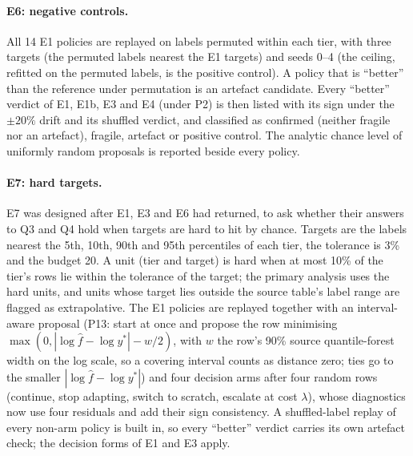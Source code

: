 \documentclass[11pt,a4paper]{article}
\begin{document}
\paragraph{E6: negative controls.} All 14 E1 policies are replayed on labels permuted within each
tier, with three targets (the permuted labels nearest the E1 targets) and seeds 0--4 (the ceiling, refitted on the permuted labels, is the positive control). A policy that is
``better'' than the reference under permutation is an artefact candidate. Every ``better'' verdict of
E1, E1b, E3 and E4 (under P2) is then listed with its sign under the $\pm 20\%$ drift and its shuffled verdict,
and classified as confirmed (neither fragile nor an artefact), fragile, artefact or positive control.
The analytic chance level of uniformly random proposals is reported beside every policy.

\paragraph{E7: hard targets.} E7 was designed after E1, E3 and E6 had returned, to ask whether
their answers to Q3 and Q4 hold when targets are hard to hit by chance. Targets are the labels nearest the 5th, 10th, 90th and 95th percentiles
of each tier, the tolerance is 3\% and the budget 20. A unit (tier and target) is hard when at most
10\% of the tier's rows lie within the tolerance of the target; the primary analysis uses the hard
units, and units whose target lies outside the source table's label range are flagged as
extrapolative. The E1 policies are replayed together with an interval-aware proposal (P13: start at
once and propose the row minimising $\max(0, |\log \hat f - \log y^{*}| - w/2)$, with $w$ the row's 90\%
source quantile-forest width on the log scale, so a covering interval counts as distance zero; ties go
to the smaller $|\log \hat f - \log y^{*}|$) and four decision arms after four random rows (continue, stop
adapting, switch to scratch, escalate at cost $\lambda$), whose diagnostics now use four residuals and
add their sign consistency. A shuffled-label replay of every non-arm policy is built in, so every
``better'' verdict carries its own artefact check; the decision forms of E1 and E3 apply.
\end{document}
